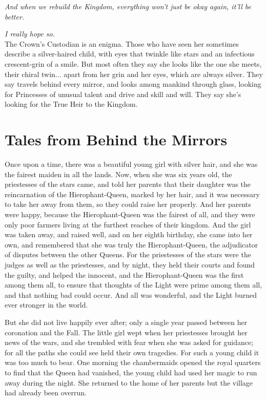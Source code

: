 \textit{And when we rebuild the Kingdom, everything won't just be okay again, it'll be better.}

\textit{I really hope so. }\\

\noindent The Crown's Custodian is an enigma. Those who have seen her sometimes describe a silver-haired child, with eyes that twinkle like stars and an infectious crescent-grin of a smile. But most often they say she looks like the one she meets, their chiral twin... apart from her grin and her eyes, which are always silver. They say travels behind every mirror, and looks among mankind through glass, looking for Princesses of unusual talent and drive and skill and will. They say she's looking for the True Heir to the Kingdom. 

\section*{Tales from Behind the Mirrors}

Once upon a time, there was a beautiful young girl with silver hair, and she was the fairest maiden in all the lands. Now, when she was six years old, the priestesses of the stars came, and told her parents that their daughter was the reincarnation of the Hierophant-Queen, marked by her hair, and it was necessary to take her away from them, so they could raise her properly. And her parents were happy, because the Hierophant-Queen was the fairest of all, and they were only poor farmers living at the furthest reaches of their kingdom. And the girl was taken away, and raised well, and on her eighth birthday, she came into her own, and remembered that she was truly the Hierophant-Queen, the adjudicator of disputes between the other Queens. For the priestesses of the stars were the judges as well as the priestesses, and by night, they held their courts and found the guilty, and helped the innocent, and the Hierophant-Queen was the first among them all, to ensure that thoughts of the Light were prime among them 
all, 
and that nothing bad could occur. And all was wonderful, and the Light burned ever stronger in the world. 

But she did not live happily ever after; only a single year passed between her coronation and the Fall. The little girl wept when her priestesses brought her news of the wars, and she trembled with fear when she was asked for guidance; for all the paths she could see held their own tragedies. For such a young child it was too much to bear. One morning the chambermaids opened the royal quarters to find that the Queen had vanished, the young child had used her magic to run away during the night. She returned to the home of her parents but the village had already been overrun. 

